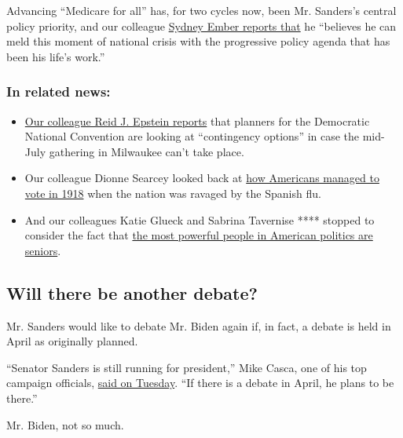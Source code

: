 Advancing ``Medicare for all'' has, for two cycles now, been Mr.
Sanders's central policy priority, and our colleague
\href{https://www.nytimes3xbfgragh.onion/2020/03/26/us/politics/bernie-sanders-coronavirus.html}{Sydney
Ember reports that} he ``believes he can meld this moment of national
crisis with the progressive policy agenda that has been his life's
work.''

\hypertarget{in-related-news}{%
\subsubsection{In related news:}\label{in-related-news}}

\begin{itemize}
\item
  \href{https://www.nytimes3xbfgragh.onion/2020/03/23/us/politics/democratic-convention-milwaukee-coronavirus.html}{Our
  colleague Reid J. Epstein reports} that planners for the Democratic
  National Convention are looking at ``contingency options'' in case the
  mid-July gathering in Milwaukee can't take place.
\item
  Our colleague Dionne Searcey looked back at
  \href{https://www.nytimes3xbfgragh.onion/2020/03/21/us/politics/1918-flu-pandemic-elections.html}{how
  Americans managed to vote in 1918} when the nation was ravaged by the
  Spanish flu.
\item
  And our colleagues Katie Glueck and Sabrina Tavernise **** stopped to
  consider the fact that
  \href{https://www.nytimes3xbfgragh.onion/2020/03/27/us/politics/biden-trump-seniors.html}{the
  most powerful people in American politics are seniors}.
\end{itemize}

\hypertarget{will-there-be-another-debate}{%
\subsection{Will there be another
debate?}\label{will-there-be-another-debate}}

Mr. Sanders would like to debate Mr. Biden again if, in fact, a debate
is held in April as originally planned.

``Senator Sanders is still running for president,'' Mike Casca, one of
his top campaign officials,
\href{https://www.nytimes3xbfgragh.onion/2020/03/24/us/politics/biden-sanders-next-democratic-debate.html}{said
on Tuesday}. ``If there is a debate in April, he plans to be there.''

Mr. Biden, not so much.

